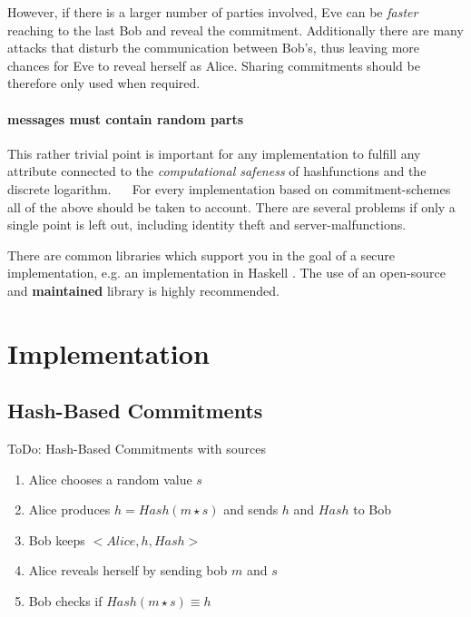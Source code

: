 \documentclass[conference]{IEEEtran}
\begin{document}
	However, if there is a larger number of parties involved, Eve can be \textit{faster} reaching to the last Bob and reveal the commitment. Additionally there are many attacks that disturb the communication between Bob's, thus leaving more chances for Eve to reveal herself as Alice. Sharing commitments should be therefore only used when required. 
	\paragraph{messages must contain random parts} This rather trivial point is important for any implementation to fulfill any attribute connected to the \textit{computational safeness} of hashfunctions and the discrete logarithm.  
~\newline ~\newline
For every implementation based on commitment-schemes all of the above should be taken to account. There are several problems if only a single point is left out, including identity theft and server-malfunctions. 

There are common libraries which support you in the goal of a secure implementation, e.g. an implementation in Haskell \cite{b0} . The use of an open-source and \textbf{maintained} library is highly recommended.
\section{Implementation}

\subsection{Hash-Based Commitments}
ToDo: Hash-Based Commitments with sources
	
	\begin{enumerate}
		\item Alice chooses a random value $s$
		\item Alice produces $h = Hash(m \star s)$ and sends $h$ and $Hash$ to Bob
		\item Bob keeps $<Alice,h,Hash>$
		\item Alice reveals herself by sending bob $m$ and $s$
		\item Bob checks if $Hash(m \star s) \equiv h$
	\end{enumerate}
\end{document}

